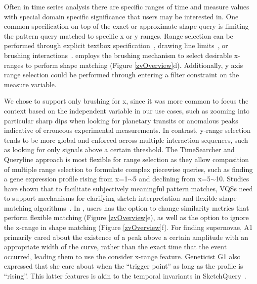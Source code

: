 
Often in time series analysis there are specific ranges of time and measure values with special domain specific significance that users may be interested in. One common specification on top of the exact or approximate shape query is limiting the pattern query matched to specific x or y ranges. Range selection can be performed through explicit textbox specification~\cite{wattenberg2001sketching,Mannino2018}, drawing line limits~\cite{ryall2005querylines}, or brushing interactions~\cite{Hochheiser2001}. \zv employs the brushing mechanism to select desirable x-ranges to perform shape matching (Figure \ref{zvOverview}d). Additionally, y axis range selection could be performed through entering a filter constraint on the measure variable.
\par We chose to support only brushing for x, since it was more common to focus the context based on the independent variable in our use cases, such as zooming into particular sharp dips when looking for planetary transits or anomalous peaks indicative of erroneous experimental measurements. In contrast, y-range selection tends to be more global and enforced across multiple interaction sequences, such as looking for only signals above a certain threshold. The TimeSearcher and Queryline approach is most flexible for range selection as they allow composition of multiple range selection to formulate complex piecewise queries, such as finding a gene expression profile rising from x=1$\sim$5 and declining from x=5$\sim$10.
Studies have shown that to facilitate subjectively meaningful pattern matches, VQSs need to support mechanisms for clarifying sketch interpretation and flexible shape matching algorithms~\cite{correll2016semantics,Mannino2018,Eichmann2015}. In \zv, users has the option to change similarity metrics that perform flexible matching (Figure \ref{zvOverview}e), as well as the option to ignore the x-range in shape matching (Figure \ref{zvOverview}f). For finding supernovae, A1 primarily cared about the existence of a peak above a certain amplitude with an appropriate width of the curve, rather than the exact time that the event occurred, leading them to use the consider x-range feature. Geneticist G1 also expressed that she care about when the ``trigger point'' as long as the profile is ``rising''. This latter features is akin to the temporal invariants in SketchQuery~\cite{correll2016semantics}.


